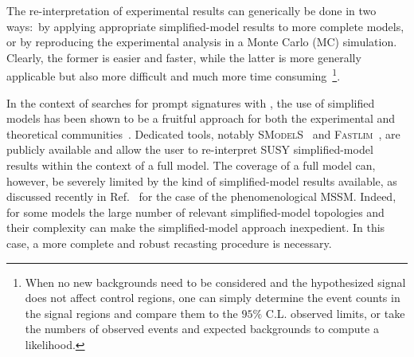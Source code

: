 The re-interpretation of experimental results can generically be done in two ways:~by applying
appropriate simplified-model results to more complete models, or by reproducing the experimental analysis in a Monte Carlo (MC) simulation.
Clearly, the former is easier and faster,
while the latter is more generally applicable but also more difficult and much more time consuming~\footnote{When no new backgrounds
need to be considered and the hypothesized signal does not affect control regions, one can simply determine the
event counts in the signal regions and compare them to the $95\%$ C.L. observed limits, or take the numbers of observed events and expected backgrounds to compute a likelihood.}.

In the context of searches for prompt signatures with \MET, the use of simplified models has been shown to be a fruitful approach for both the experimental and theoretical communities~\cite{ArkaniHamed:2007fw, Alwall:2008ag, Alves:2011wf, Okawa:2011xg,Chatrchyan:2013sza,Abercrombie:2015wmb,Boveia:2016mrp}.
Dedicated tools, notably \textsc{SModelS}~\cite{Kraml:2013mwa,Ambrogi:2017neo,Ambrogi:2018ujg} and \textsc{Fastlim}~\cite{Papucci:2014rja},
are publicly available and allow the user to re-interpret SUSY simplified-model results within the context of a full model.
The coverage of a full model can, however, be severely limited by the kind of simplified-model results available,
as discussed recently in Ref.~\cite{Ambrogi:2017lov} for the case of the phenomenological MSSM.
Indeed, for some models the large number of relevant simplified-model topologies and their complexity
can make the simplified-model approach inexpedient.
In this case, a more complete and robust recasting procedure is necessary.

